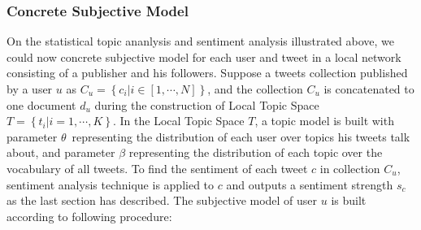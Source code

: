 \documentclass{acm_proc_article-sp}
\begin{document}
\subsubsection{Concrete Subjective Model}
On the statistical topic ananlysis and sentiment analysis illustrated above, we could now concrete subjective model for each user and tweet in a local network consisting of a publisher and his followers. 
Suppose a tweets collection published by a user $ u $ as $ C_{u}=\left\lbrace c_{i} \vert i \in \left[ 1, \cdots, N \right]  \right\rbrace  $, and the collection $ C_{u} $ is concatenated to one document $ d_{u} $ during the construction of Local Topic Space $ T=\left\lbrace t_{i} \vert i=1, \cdots, K \right\rbrace $.
In the Local Topic Space $ T $, a topic model is built with parameter $ \theta $\ representing the distribution of each user over topics his tweets talk about, and parameter $ \beta $ representing the distribution of each topic over the vocabulary of all tweets.
To find the sentiment of each tweet $ c $ in collection $ C_{u} $, sentiment analysis technique is applied to $ c $ and outputs a sentiment strength $ s_{c} $ as the last section has described. 
The subjective model of user $ u $ is built according to following procedure:
\end{document}
